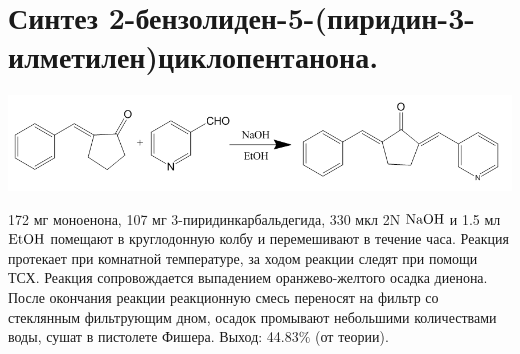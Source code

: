 \documentclass[a4paper]{article}
\begin{document}
\section*{Синтез 2-бензолиден-5-(пиридин-3-илметилен)циклопентанона.}
\begin{center}
\includegraphics[scale=0.35]{pictures/3.png}
\end{center}
172 мг моноенона, 107 мг 3-пиридинкарбальдегида, 330 мкл 2N $\ce{NaOH}$ и 1.5 мл $\ce{EtOH}$ помещают в круглодонную колбу и перемешивают в течение часа. Реакция протекает при комнатной температуре, за ходом реакции следят при помощи ТСХ. Реакция сопровождается выпадением оранжево-желтого осадка диенона. После окончания реакции реакционную смесь переносят на фильтр со стеклянным фильтрующим дном, осадок промывают небольшими количествами воды, сушат в пистолете Фишера.
Выход: 44.83$\%$ (от теории).
\end{document}
